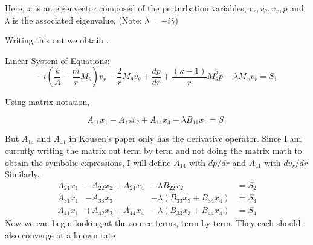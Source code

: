 Here, $x$ is an eigenvector composed of the perturbation variables, $v_r,v_{\theta},v_x,p$ and $\lambda$ is the associated eigenvalue, (Note: $\lambda = -i \bar{\gamma}$)

Writing this out we obtain \cdots.

Linear System of Equations:
\begin{equation}
    -
    i \left(
        \frac{k}{A} - \frac{m}{r} M_{\theta}
    \right)
    v_r 
    -
    \frac{2}{r} M_{\theta} v_{\theta} 
    +
    \frac{dp}{dr} 
    +
    \frac{(\kappa - 1)}{r} M_{\theta}^2 p
    -
    \lambda M_x v_r =S_1
\end{equation}

Using matrix notation,

\begin{equation}
    A_{11}
    x_1 
    -
    A_{12} x_2 
    +
    A_{14} x_4
    -
    \lambda B_{11} x_1 = S_1
\end{equation}


But $A_{14}$ and $A_{41}$ in Kousen's paper only has the derivative operator.
Since I am currntly writing the matrix out term by term and not doing the matrix 
math to obtain the symbolic expressions, I will define $A_{14}$ with $dp/dr$ 
and $A_{41}$ with $dv_r/dr$
Similarly,
\begin{align}
    A_{21} x_1 &-
    A_{22} x_2 +
    A_{24} x_4 &-
    \lambda B_{22} x_2 &= S_2 \\
    A_{31} x_1 &-
    A_{33} x_3 &-
    \lambda (B_{33} x_3 + B_{34} x_4) &= S_3\\
    A_{41} x_1 &+
    A_{42} x_2 +
    A_{44} x_4 &- 
    \lambda (B_{33} x_3 + B_{44} x_4) &= S_4
\end{align}
Now we can begin looking at the source terms, term by term. They each should also
converge at a known rate





